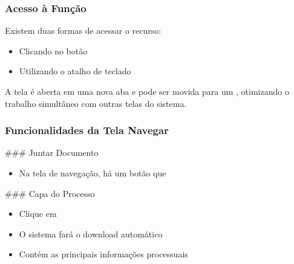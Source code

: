 \documentclass[letterpaper,10pt,brazil]{sphinxmanual}
\begin{document}
\subsubsection{Acesso à Função}
\label{\detokenize{projud_16_navegandoprocessos:acesso-a-funcao}}
\sphinxAtStartPar
Existem duas formas de acessar o recurso:
\begin{itemize}
\item {} 
\sphinxAtStartPar
Clicando no botão 

\item {} 
\sphinxAtStartPar
Utilizando o atalho de teclado 

\end{itemize}

\sphinxAtStartPar
A tela é aberta em uma nova aba e pode ser movida para um , otimizando o trabalho simultâneo com outras telas do sistema.


\subsubsection{Funcionalidades da Tela Navegar}
\label{\detokenize{projud_16_navegandoprocessos:funcionalidades-da-tela-navegar}}
\sphinxAtStartPar
\#\#\# Juntar Documento
\begin{itemize}
\item {} 
\sphinxAtStartPar
Na tela de navegação, há um botão que 

\end{itemize}

\sphinxAtStartPar
\#\#\# Capa do Processo
\begin{itemize}
\item {} 
\sphinxAtStartPar
Clique em 

\item {} 
\sphinxAtStartPar
O sistema fará o download automático

\item {} 
\sphinxAtStartPar
Contém as principais informações processuais

\end{itemize}
\end{document}
